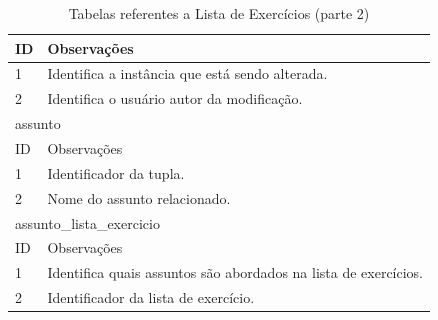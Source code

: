 \documentclass[graduacao,brazil]{ThesisPUC}
\begin{document}
\begin{table}[H]
{\begin{tabular}{|l|l|}
    ID                      & Observações                                                                                           \\ \hline
    1                       & Identifica a instância que está sendo alterada.                                                       \\ \hline
    2                       & Identifica o usuário autor da modificação.                                                            \\ \hline
    \multicolumn{2}{|l|}{assunto} \\ \hline
    ID                      & Observações                                                                                           \\ \hline
    1                       & Identificador da tupla.                                                                               \\ \hline
    2                       & Nome do assunto relacionado.                                                                          \\ \hline
    \multicolumn{2}{|l|}{assunto\_lista\_exercicio} \\ \hline
    ID                      & Observações                                                                                           \\ \hline
    1                       & Identifica quais assuntos são abordados na lista de exercícios.                                       \\ \hline
    2                       & Identificador da lista de exercício.                                                                  \\ \hline
    \end{tabular}
    }
    \caption {Tabelas referentes a Lista de Exerc\'{i}cios (parte 2)}
\end{table}
\end{document}
